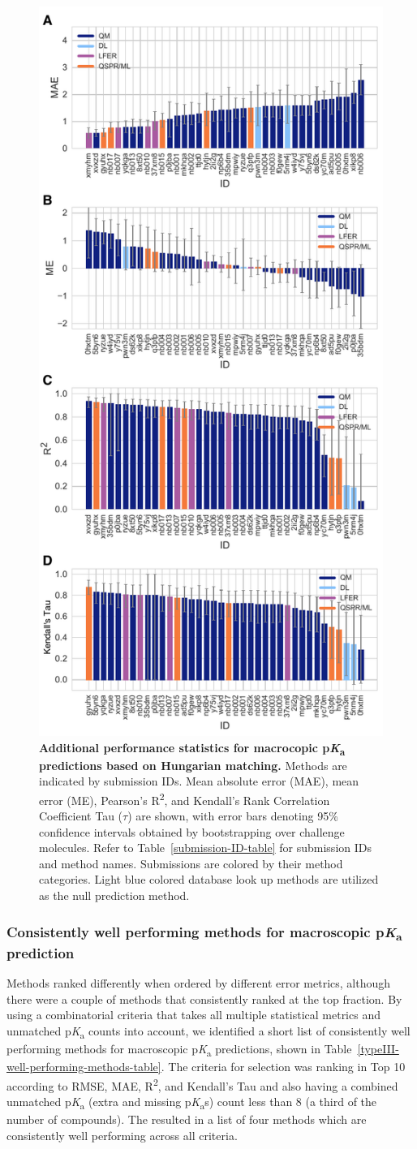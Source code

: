 \documentclass[9pt,lineno,final]{elife}
\newcommand{\pKa}{p\textit{K}\textsubscript{a}}
\begin{document}
\begin{figure}[ht!]
\centering
\includegraphics[width=0.5\linewidth]{figures/typeIII_statistics.pdf}
\caption{{\bf Additional performance statistics for macrocopic \pKa{} predictions based on Hungarian matching.} 
Methods are indicated by submission IDs. 
Mean absolute error (MAE), mean error (ME), Pearson’s R\textsuperscript{2}, and Kendall’s Rank Correlation Coefficient Tau ($\tau$) are shown, with error bars denoting 95\% confidence intervals obtained by bootstrapping over challenge molecules. Refer to Table~\ref{submission-ID-table} for submission IDs and method names. Submissions are colored by their method categories. Light blue colored database look up methods are utilized as the null prediction method.
}
\label{fig:typeIII-statistics}
\end{figure}


\subsubsection{Consistently well performing methods for macroscopic \pKa{} prediction}

Methods ranked differently when ordered by different error metrics, although there were a couple of methods that consistently ranked at the top fraction. 
By using a combinatorial criteria that takes all multiple statistical metrics and unmatched \pKa{} counts into account, we identified a short list of consistently well performing methods for macroscopic \pKa{} predictions, shown in Table~\ref{typeIII-well-performing-methods-table}. 
The criteria for selection was ranking in Top 10 according to RMSE, MAE, R\textsuperscript{2}, and Kendall's Tau and also having a combined unmatched \pKa{} (extra and missing \pKa{}s) count less than 8 (a third of the number of compounds).
The resulted in a list of four methods which are consistently well performing across all criteria.
\end{document}
